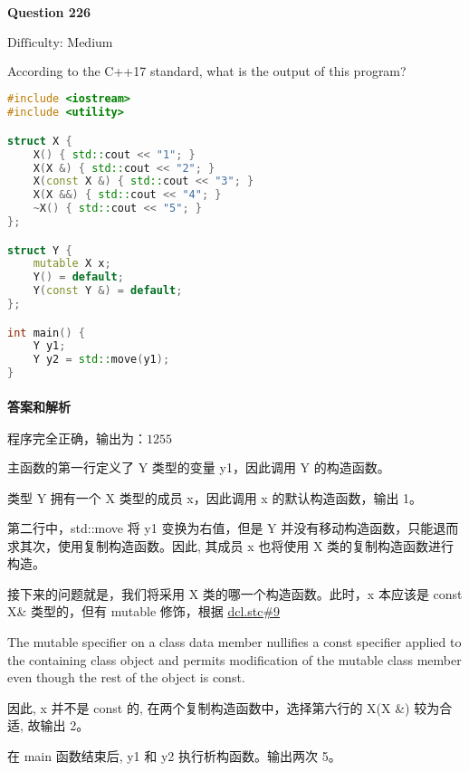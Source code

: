 \documentclass{article}
\begin{document}
	\paragraph*{Question 226}\noindent $\boxed{\text{Difficulty: Medium}} $
	
	According to the C++17 standard, what is the output of this program? 
	
	\begin{lstlisting}[language=C++]    
#include <iostream>
#include <utility>

struct X {
	X() { std::cout << "1"; }
	X(X &) { std::cout << "2"; }
	X(const X &) { std::cout << "3"; }
	X(X &&) { std::cout << "4"; }
	~X() { std::cout << "5"; }
};

struct Y {
	mutable X x;
	Y() = default;
	Y(const Y &) = default;
};

int main() {
	Y y1;
	Y y2 = std::move(y1);
}
	\end{lstlisting}
	
	\paragraph*{答案和解析} $\boxed{\text{程序完全正确，输出为：1255}} $
	
	主函数的第一行定义了 Y 类型的变量 y1，因此调用 Y 的构造函数。
	
	类型 Y 拥有一个 X 类型的成员 x，因此调用 x 的默认构造函数，输出 1。
	
	第二行中，std::move 将 y1 变换为右值，但是 Y 并没有移动构造函数，只能退而求其次，使用复制构造函数。因此, 其成员 x 也将使用 X 类的复制构造函数进行构造。
	
	接下来的问题就是，我们将采用 X 类的哪一个构造函数。此时，x 本应该是 const X\& 类型的，但有 mutable 修饰，根据 \href{https://timsong-cpp.github.io/cppwp/n4659/dcl.stc#9}{dcl.stc\#9}
	
	\begin{lightgrayleftbar}
		The mutable specifier on a class data member nullifies a const specifier applied to the containing class object and permits modification of the mutable class member even though the rest of the object is const.
	\end{lightgrayleftbar}
	
	因此, x 并不是 const 的, 在两个复制构造函数中，选择第六行的 X(X \&) 较为合适, 故输出 2。
	
	在 main 函数结束后, y1 和 y2 执行析构函数。输出两次 5。
\end{document}

